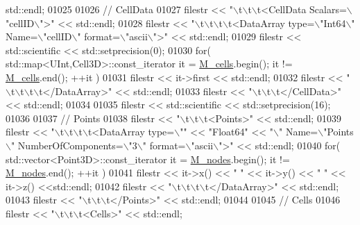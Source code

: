 \begin{DoxyCode}
      std::endl;
01025 
01026     \textcolor{comment}{// CellData}
01027     filestr << \textcolor{stringliteral}{"\(\backslash\)t\(\backslash\)t\(\backslash\)t<CellData Scalars=\(\backslash\)"cellID\(\backslash\)">"} << std::endl;
01028     filestr << \textcolor{stringliteral}{"\(\backslash\)t\(\backslash\)t\(\backslash\)t\(\backslash\)t<DataArray type=\(\backslash\)"Int64\(\backslash\)" Name=\(\backslash\)"cellID\(\backslash\)" format=\(\backslash\)"ascii\(\backslash\)">"} << std::endl;
01029     filestr << std::scientific << std::setprecision(0);
01030     \textcolor{keywordflow}{for}( std::map<UInt,Cell3D>::const\_iterator it = \hyperlink{classFVCode3D_1_1Mesh3D_a8cac877e809226fb96078183efb25a2f}{M\_cells}.begin(); it != 
      \hyperlink{classFVCode3D_1_1Mesh3D_a8cac877e809226fb96078183efb25a2f}{M\_cells}.end(); ++it )
01031         filestr << it->first << std::endl;
01032     filestr << \textcolor{stringliteral}{"\(\backslash\)t\(\backslash\)t\(\backslash\)t\(\backslash\)t</DataArray>"} << std::endl;
01033     filestr << \textcolor{stringliteral}{"\(\backslash\)t\(\backslash\)t\(\backslash\)t</CellData>"} << std::endl;
01034 
01035     filestr << std::scientific << std::setprecision(16);
01036 
01037     \textcolor{comment}{// Points}
01038     filestr << \textcolor{stringliteral}{"\(\backslash\)t\(\backslash\)t\(\backslash\)t<Points>"} << std::endl;
01039     filestr << \textcolor{stringliteral}{"\(\backslash\)t\(\backslash\)t\(\backslash\)t\(\backslash\)t<DataArray type=\(\backslash\)""} << \textcolor{stringliteral}{"Float64"} << \textcolor{stringliteral}{"\(\backslash\)" Name=\(\backslash\)"Points\(\backslash\)" NumberOfComponents=\(\backslash\)"3\(\backslash\)"
       format=\(\backslash\)"ascii\(\backslash\)">"} << std::endl;
01040     \textcolor{keywordflow}{for}( std::vector<Point3D>::const\_iterator it = \hyperlink{classFVCode3D_1_1Mesh3D_a5464981fd097ce785675d91522884739}{M\_nodes}.begin(); it != 
      \hyperlink{classFVCode3D_1_1Mesh3D_a5464981fd097ce785675d91522884739}{M\_nodes}.end(); ++it )
01041         filestr << it->x() << \textcolor{stringliteral}{" "} << it->y() << \textcolor{stringliteral}{" "} << it->z() <<std::endl;
01042     filestr << \textcolor{stringliteral}{"\(\backslash\)t\(\backslash\)t\(\backslash\)t\(\backslash\)t</DataArray>"} << std::endl;
01043     filestr << \textcolor{stringliteral}{"\(\backslash\)t\(\backslash\)t\(\backslash\)t</Points>"} << std::endl;
01044 
01045     \textcolor{comment}{// Cells}
01046     filestr << \textcolor{stringliteral}{"\(\backslash\)t\(\backslash\)t\(\backslash\)t<Cells>"} << std::endl;

\end{DoxyCode}
